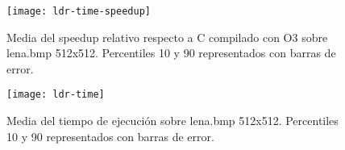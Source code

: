 \begin{figure}[h]
    \centering
    \texttt{[image: ldr-time-speedup]}
    \caption{Media del speedup relativo respecto a C compilado con O3 sobre lena.bmp 512x512. Percentiles 10 y 90 representados con barras de error.}
    \label{fig:ldr-time-speedup}
\end{figure}

\begin{figure}[h]
    \centering
    \texttt{[image: ldr-time]}
    \caption{Media del tiempo de ejecución sobre lena.bmp 512x512. Percentiles 10 y 90 representados con barras de error.}
    \label{fig:ldr-time-speedup}
\end{figure}


